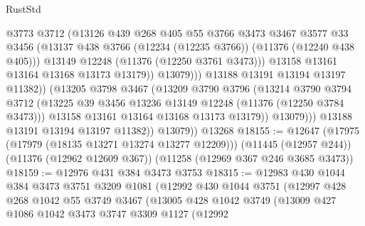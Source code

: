 \begin{lexlean}{RustStd}
\begin{coremodule}
{\begin{coremodule}
{{{{{{{{{{{{{{{{{{{{{{{{{{{{{{{{{{{{{{{{{{{{{{{{{{{{{{{{{{{{{{{{{{{{{{{{{{{{{{{{{{{{{                              @3773
                              @3712
                              (@13126
                                @439
                                @268
                                @405
                                @55
                                @3766
                                @3473
                                @3467
                                @3577
                                @33
                                @3456
                                (@13137
                                  @438
                                  @3766
                                  (@12234 (@12235 @3766))
                                  (@11376 (@12240 @438 @405)))
                                @13149
                                @12248
                                (@11376 (@12250 @3761 @3473)))
                              @13158
                              @13161
                              @13164
                              @13168
                              @13173
                              @13179))
                          @13079)))
                    @13188
                    @13191
                    @13194
                    @13197
                    @11382))
                (@13205
                  @3798
                  @3467
                  (@13209
                    @3790
                    @3796
                    (@13214
                      @3790
                      @3794
                      @3712
                      (@13225 @39 @3456 @13236 @13149 @12248 (@11376 (@12250 @3784 @3473)))
                      @13158
                      @13161
                      @13164
                      @13168
                      @13173
                      @13179))
                  @13079)))
            @13188
            @13191
            @13194
            @13197
            @11382))
        @13079))
    @13268
@18155 := @12647
    (@17975 (@17979 (@18135 @13271 @13274 @13277 @12209)))
    (@11445 (@12957 @244))
    (@11376 (@12962 @12609 @367))
    (@11258 (@12969 @367 @246 @3685 @3473))
@18159 := @12976 @431 @384 @3473 @3753
@18315 := @12983
    @430
    @1044
    @384
    @3473
    @3751
    @3209
    @1081
    (@12992
      @430
      @1044
      @3751
      (@12997
        @428
        @268
        @1042
        @55
        @3749
        @3467
        (@13005
          @428
          @1042
          @3749
          (@13009
            @427
            @1086
            @1042
            @3473
            @3747
            @3309
            @1127
            (@12992
}}}}}}}}}}}}}}}}}}}}}}}}}}}}}}}}}}}}}}}}}}}}}}}}}}}}}}}}}}}}}}}}}}}}}}}}}}}}}}}}}}}}}
\end{coremodule}}
\end{coremodule}
\end{lexlean}
